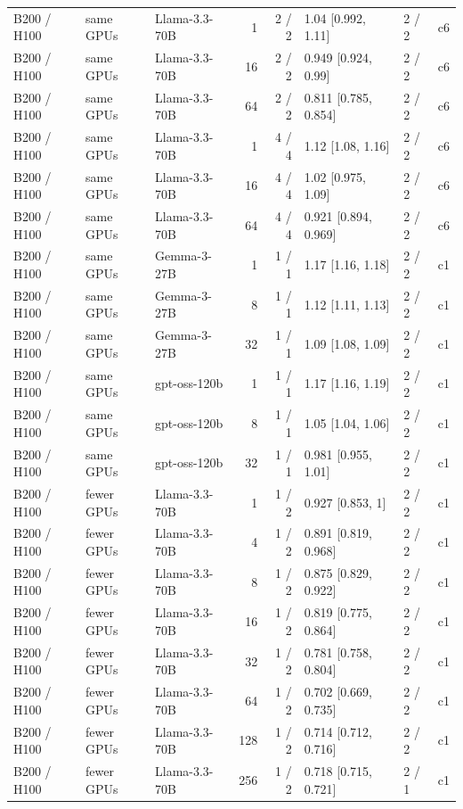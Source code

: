 \begin{longtable}{lllrrlll}
B200 / H100 & same GPUs & Llama-3.3-70B & 1 & 2 / 2 & 1.04 {[}0.992, 1.11{]} & 2 / 2 & c6 \\
B200 / H100 & same GPUs & Llama-3.3-70B & 16 & 2 / 2 & 0.949 {[}0.924, 0.99{]} & 2 / 2 & c6 \\
B200 / H100 & same GPUs & Llama-3.3-70B & 64 & 2 / 2 & 0.811 {[}0.785, 0.854{]} & 2 / 2 & c6 \\
B200 / H100 & same GPUs & Llama-3.3-70B & 1 & 4 / 4 & 1.12 {[}1.08, 1.16{]} & 2 / 2 & c6 \\
B200 / H100 & same GPUs & Llama-3.3-70B & 16 & 4 / 4 & 1.02 {[}0.975, 1.09{]} & 2 / 2 & c6 \\
B200 / H100 & same GPUs & Llama-3.3-70B & 64 & 4 / 4 & 0.921 {[}0.894, 0.969{]} & 2 / 2 & c6 \\
B200 / H100 & same GPUs & Gemma-3-27B & 1 & 1 / 1 & 1.17 {[}1.16, 1.18{]} & 2 / 2 & c1 \\
B200 / H100 & same GPUs & Gemma-3-27B & 8 & 1 / 1 & 1.12 {[}1.11, 1.13{]} & 2 / 2 & c1 \\
B200 / H100 & same GPUs & Gemma-3-27B & 32 & 1 / 1 & 1.09 {[}1.08, 1.09{]} & 2 / 2 & c1 \\
B200 / H100 & same GPUs & gpt-oss-120b & 1 & 1 / 1 & 1.17 {[}1.16, 1.19{]} & 2 / 2 & c1 \\
B200 / H100 & same GPUs & gpt-oss-120b & 8 & 1 / 1 & 1.05 {[}1.04, 1.06{]} & 2 / 2 & c1 \\
B200 / H100 & same GPUs & gpt-oss-120b & 32 & 1 / 1 & 0.981 {[}0.955, 1.01{]} & 2 / 2 & c1 \\
B200 / H100 & fewer GPUs & Llama-3.3-70B & 1 & 1 / 2 & 0.927 {[}0.853, 1{]} & 2 / 2 & c1 \\
B200 / H100 & fewer GPUs & Llama-3.3-70B & 4 & 1 / 2 & 0.891 {[}0.819, 0.968{]} & 2 / 2 & c1 \\
B200 / H100 & fewer GPUs & Llama-3.3-70B & 8 & 1 / 2 & 0.875 {[}0.829, 0.922{]} & 2 / 2 & c1 \\
B200 / H100 & fewer GPUs & Llama-3.3-70B & 16 & 1 / 2 & 0.819 {[}0.775, 0.864{]} & 2 / 2 & c1 \\
B200 / H100 & fewer GPUs & Llama-3.3-70B & 32 & 1 / 2 & 0.781 {[}0.758, 0.804{]} & 2 / 2 & c1 \\
B200 / H100 & fewer GPUs & Llama-3.3-70B & 64 & 1 / 2 & 0.702 {[}0.669, 0.735{]} & 2 / 2 & c1 \\
B200 / H100 & fewer GPUs & Llama-3.3-70B & 128 & 1 / 2 & 0.714 {[}0.712, 0.716{]} & 2 / 2 & c1 \\
B200 / H100 & fewer GPUs & Llama-3.3-70B & 256 & 1 / 2 & 0.718 {[}0.715, 0.721{]} & 2 / 1 & c1 \\

\end{longtable}
